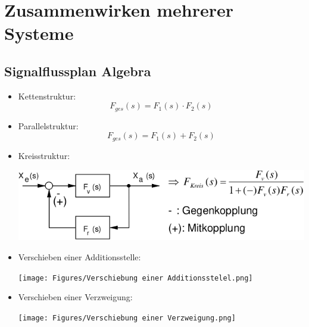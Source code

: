 \section{Zusammenwirken mehrerer Systeme}

\subsection{Signalflussplan Algebra}
\begin{itemize}[leftmargin=*]
	\item Kettenstruktur:
	    \[F_{ges}(s) = F_1(s) \cdot F_2(s)\]

	\item Parallelstruktur:
		\[F_{ges}(s) = F_1(s) + F_2(s)\]

	\item Kreisstruktur:
	      \begin{center}
		      \includegraphics[width=0.96\columnwidth]{Figures/Kreisstruktur.png}
	      \end{center}

	\item Verschieben einer Additionsstelle:
	      \begin{center}
		      \texttt{[image: Figures/Verschiebung einer Additionsstelel.png]}
	      \end{center}

	\item Verschieben einer Verzweigung:
	      \begin{center}
		      \texttt{[image: Figures/Verschiebung einer Verzweigung.png]}
	      \end{center}
\end{itemize}


